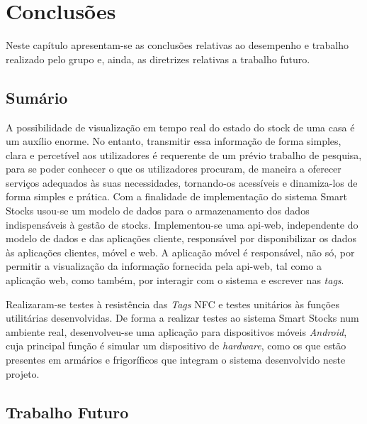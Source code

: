 %
%
\chapter{Conclusões} \label{cap4}

Neste capítulo apresentam-se as conclusões relativas ao desempenho e trabalho realizado pelo grupo e, ainda, as diretrizes relativas a trabalho futuro. 

%
%
\section{Sumário}\label{sec41}

A possibilidade de visualização em tempo real do estado do stock de uma casa é um auxílio enorme.
No entanto, transmitir essa informação de forma simples, clara e percetível aos utilizadores é requerente de um prévio trabalho de pesquisa, para se poder conhecer o que os utilizadores procuram, de maneira a oferecer serviços adequados às suas necessidades, tornando-os acessíveis e dinamiza-los de forma simples e prática.
Com a finalidade de implementação do sistema Smart Stocks usou-se um modelo de dados para o armazenamento dos dados indispensáveis à gestão de stocks. Implementou-se uma \gls{api-web}, independente do modelo de dados e das aplicações cliente, responsável por disponibilizar os dados às aplicações clientes, móvel e web. A aplicação móvel é responsável, não só, por permitir a visualização da informação fornecida pela \gls{api-web}, tal como a aplicação web, como também, por interagir com o sistema e escrever nas \textit{tags}.

Realizaram-se testes à resistência das \textit{Tags} NFC e testes unitários às funções utilitárias desenvolvidas. De forma a realizar testes ao sistema Smart Stocks num ambiente real, desenvolveu-se uma aplicação para dispositivos móveis \textit{Android}, cuja principal função é simular um dispositivo de \textit{hardware}, como os que estão presentes em armários e frigoríficos que integram o sistema desenvolvido neste projeto.

%
%
\section{Trabalho Futuro}\label{sec42}

